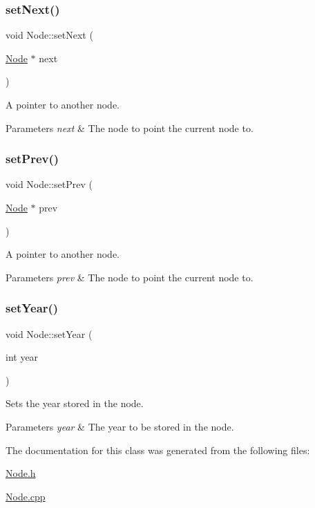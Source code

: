 \subsubsection{\texorpdfstring{set\+Next()}{setNext()}}
{\footnotesize\ttfamily void Node\+::set\+Next (\begin{DoxyParamCaption}\item[{\hyperlink{class_node}{Node} $\ast$}]{next }\end{DoxyParamCaption})}



A pointer to another node. 


\begin{DoxyParams}{Parameters}
{\em next} & The node to point the current node to. \\
\hline
\end{DoxyParams}
\hypertarget{class_node_a169576a90ab0bd0706491c445616c909}{}\label{class_node_a169576a90ab0bd0706491c445616c909} 
\subsubsection{\texorpdfstring{set\+Prev()}{setPrev()}}
{\footnotesize\ttfamily void Node\+::set\+Prev (\begin{DoxyParamCaption}\item[{\hyperlink{class_node}{Node} $\ast$}]{prev }\end{DoxyParamCaption})}



A pointer to another node. 


\begin{DoxyParams}{Parameters}
{\em prev} & The node to point the current node to. \\
\hline
\end{DoxyParams}
\hypertarget{class_node_abd3420118a8a964e0678d1a975039e1f}{}\label{class_node_abd3420118a8a964e0678d1a975039e1f} 
\subsubsection{\texorpdfstring{set\+Year()}{setYear()}}
{\footnotesize\ttfamily void Node\+::set\+Year (\begin{DoxyParamCaption}\item[{int}]{year }\end{DoxyParamCaption})}



Sets the year stored in the node. 


\begin{DoxyParams}{Parameters}
{\em year} & The year to be stored in the node. \\
\hline
\end{DoxyParams}


The documentation for this class was generated from the following files\+:\begin{DoxyCompactItemize}
\item 
\hyperlink{_node_8h}{Node.\+h}\item 
\hyperlink{_node_8cpp}{Node.\+cpp}\end{DoxyCompactItemize}
